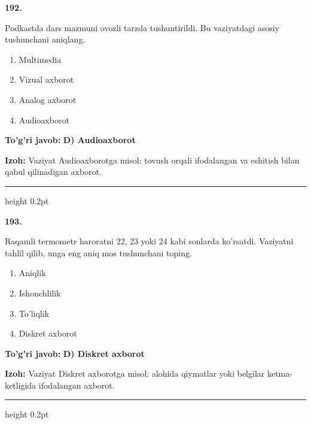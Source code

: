 \documentclass[10pt,a4paper,oneside]{article}
\begin{document}
\noindent\textbf{\color{ink}192.}
\par
Podkastda dars mazmuni ovozli tarzda tushuntirildi. Bu vaziyatdagi asosiy tushunchani aniqlang.
\begin{enumerate}[label=\Alph*),leftmargin=9mm]
\item Multimedia
\item Vizual axborot
\item Analog axborot
\item Audioaxborot
\end{enumerate}
\begin{tcolorbox}[enhanced,breakable,colback=teal!4,colframe=teal!50!black,boxrule=0.5pt,arc=1.1mm,left=3mm,right=3mm,top=1.7mm,bottom=1.7mm,before skip=2mm,after skip=2mm]
\textbf{\color{teal}To'g'ri javob:} \textbf{D) Audioaxborot}
\par\smallskip
\textbf{Izoh:} Vaziyat Audioaxborotga misol: tovush orqali ifodalangan va eshitish bilan qabul qilinadigan axborot.
\end{tcolorbox}
\vspace{2mm}\hrule height 0.2pt \vspace{3mm}

\noindent\textbf{\color{ink}193.}
\par
Raqamli termometr haroratni 22, 23 yoki 24 kabi sonlarda ko'rsatdi. Vaziyatni tahlil qilib, unga eng aniq mos tushunchani toping.
\begin{enumerate}[label=\Alph*),leftmargin=9mm]
\item Aniqlik
\item Ishonchlilik
\item To'liqlik
\item Diskret axborot
\end{enumerate}
\begin{tcolorbox}[enhanced,breakable,colback=teal!4,colframe=teal!50!black,boxrule=0.5pt,arc=1.1mm,left=3mm,right=3mm,top=1.7mm,bottom=1.7mm,before skip=2mm,after skip=2mm]
\textbf{\color{teal}To'g'ri javob:} \textbf{D) Diskret axborot}
\par\smallskip
\textbf{Izoh:} Vaziyat Diskret axborotga misol: alohida qiymatlar yoki belgilar ketma-ketligida ifodalangan axborot.
\end{tcolorbox}
\vspace{2mm}\hrule height 0.2pt \vspace{3mm}
\end{document}
